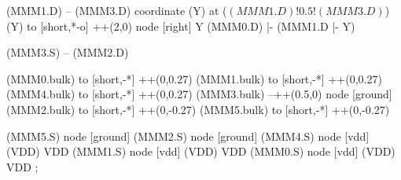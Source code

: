 \begin{circuitikz}[american]
	(MMM1.D) -- (MMM3.D)
	coordinate (Y) at ($(MMM1.D)!0.5!(MMM3.D)$)
	(Y) to [short,*-o] ++(2,0) node [right] {Y}
	(MMM0.D) |- (MMM1.D |- Y)
	
	(MMM3.S) -- (MMM2.D)
	
	(MMM0.bulk) to [short,-*] ++(0,0.27)
	(MMM1.bulk) to [short,-*] ++(0,0.27)
	(MMM4.bulk) to [short,-*] ++(0,0.27)
	(MMM3.bulk) --++(0.5,0) node [ground] {}
	(MMM2.bulk) to [short,-*] ++(0,-0.27)
	(MMM5.bulk) to [short,-*] ++(0,-0.27)


	(MMM5.S) node [ground] {}
	(MMM2.S) node [ground] {}
	(MMM4.S) node [vdd] (VDD) {VDD}
	(MMM1.S) node [vdd] (VDD) {VDD}
	(MMM0.S) node [vdd] (VDD) {VDD}
;

\end{circuitikz}

